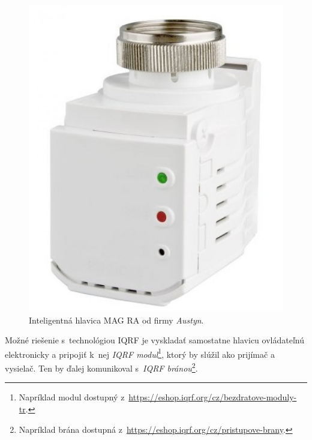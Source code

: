 \begin{figure}[H]
    \centering
    \includegraphics[scale=0.4]{obrazky-figures/m_retusovana-hlavica.jpg}
    \caption{Inteligentná hlavica MAG RA od firmy \emph{Austyn}.}
    \label{fig:IQRF-TRV}
\end{figure}


Možné riešenie s~technológiou IQRF je vyskladať samostatne hlavicu ovládateľnú elektronicky a pripojiť k~nej \emph{IQRF modul}\footnote{Napríklad modul dostupný z~\url{https://eshop.iqrf.org/cz/bezdratove-moduly-tr}.}, ktorý by slúžil ako prijímač a vysielač. 
Ten by ďalej komunikoval s~\emph{IQRF bránou}\footnote{Napríklad brána dostupná z~\url{https://eshop.iqrf.org/cz/pristupove-brany}.}.  
